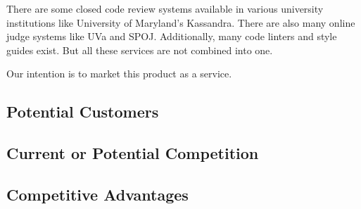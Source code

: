 
There are some closed code review systems available in various university
institutions like \cite{Matt} University of Maryland's Kassandra. There are also
many online judge systems like UVa and SPOJ. Additionally, many code linters and
style guides exist. But all these services are not combined into one.

Our intention is to market this product as a service.
\subsection{Potential Customers}
\subsection{Current or Potential Competition}
\subsection{Competitive Advantages}
